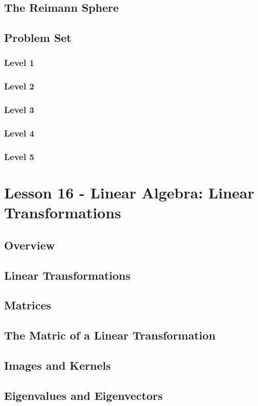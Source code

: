 \documentclass{article}
\begin{document}
\subsection{The Reimann Sphere}
\subsection{Problem Set}
\subsubsection{Level 1}
\subsubsection{Level 2}
\subsubsection{Level 3}
\subsubsection{Level 4}
\subsubsection{Level 5}
\pagebreak

\section{Lesson 16 - Linear Algebra: Linear Transformations}
\subsection{Overview}
\subsection{Linear Transformations}
\subsection{Matrices}
\subsection{The Matric of a Linear Transformation}
\subsection{Images and Kernels}
\subsection{Eigenvalues and Eigenvectors}
\end{document}
